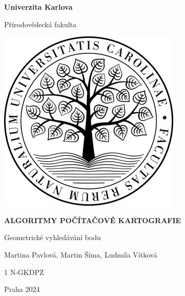 \documentclass{article}
\begin{document}
\begin{titlepage}
    \centering
    \Large\textbf{Univerzita Karlova}
    
    \Large{Přírodovědecká fakulta}
    
    \vspace*{2.5cm}
    \includegraphics[width=0.55\linewidth]{images/prf.png}
    \vspace*{4cm}
    
    \Large\textbf{ALGORITMY POČÍTAČOVÉ KARTOGRAFIE}
    
    \Large{Geometrické vyhledávání bodu}
    
    \vspace*{3cm}
    \large Martina Pavlová, Martin Šíma, Ludmila Vítková

    1 N-GKDPZ
    
    Praha 2024
\end{titlepage}
\end{document}
